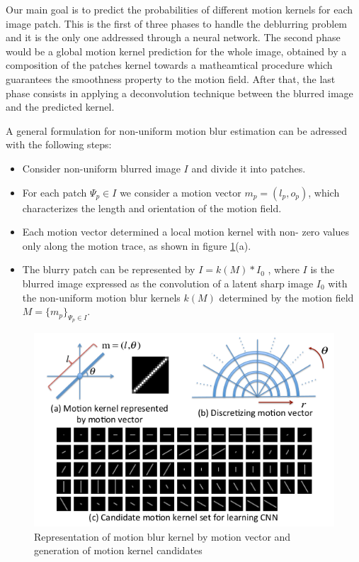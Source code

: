 \documentclass[12pt,a4paper]{article}
\begin{document}
Our main goal is to predict the probabilities of different motion kernels for each image patch. This is the first of three phases to handle the deblurring problem and it is the only one addressed through a neural network. The second phase would be a global motion kernel prediction for the whole image, obtained by a composition of the patches kernel towards a matheamtical procedure which guarantees the smoothness property to the motion field. After that, the last phase consists in applying a deconvolution technique between the blurred image and the predicted kernel. 

A general formulation for non-uniform motion blur estimation can be adressed with the following steps:

\begin{itemize}
\item Consider non-uniform blurred image $I$ and divide it into patches.
\item For each patch $\Psi_p\in I$ we consider a motion vector $m_p = (l_p , o_p )$, which characterizes the length and orientation of the motion field.
\item Each motion vector determined a local motion kernel with non-
zero values only along the motion trace, as shown in figure \ref{motion_kernel}(a).
\item The blurry patch can be represented by $I = k(M)*I_0$ , where $I$ is the blurred image expressed as the convolution of a latent sharp image $I_0$ with the non-uniform motion blur kernels $k(M)$ determined by the motion field $M = \lbrace m_p\rbrace _{\Psi_p\in I}$.
\end{itemize}

\begin{figure}[hptb]
\centering
\includegraphics[scale=0.5]{motion_kernel.png} 
\caption{Representation of motion blur kernel by motion vector
and generation of motion kernel candidates}
\label{motion_kernel}
\end{figure}
\end{document}
